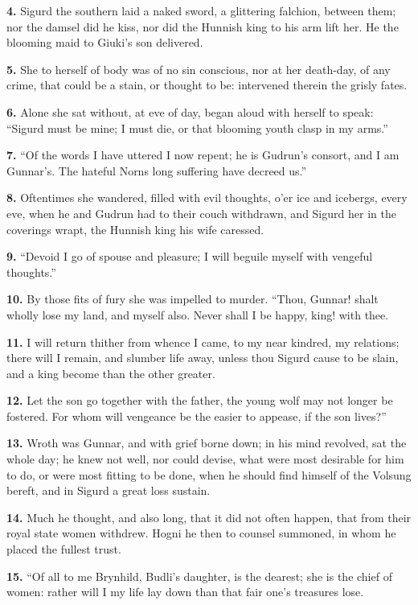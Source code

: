 \textbf{4.} Sigurd the southern laid a naked sword, a glittering falchion,
between them; nor the damsel did he kiss, nor did the Hunnish king to
his arm lift her. He the blooming maid to Giuki's son delivered.

\textbf{5.} She to herself of body was of no sin conscious, nor at her
death-day, of any crime, that could be a stain, or thought to be:
intervened therein the grisly fates.

\textbf{6.} Alone she sat without, at eve of day, began aloud with herself to
speak: ``Sigurd must be mine; I must die, or that blooming youth clasp
in my arms.''

\textbf{7.} ``Of the words I have uttered I now repent; he is Gudrun's
consort, and I am Gunnar's. The hateful Norns long suffering have
decreed us.''

\textbf{8.} Oftentimes she wandered, filled with evil thoughts, o'er ice and
icebergs, every eve, when he and Gudrun had to their couch withdrawn,
and Sigurd her in the coverings wrapt, the Hunnish king his wife
caressed.

\textbf{9.} ``Devoid I go of spouse and pleasure; I will beguile myself with
vengeful thoughts.''

\textbf{10.} By those fits of fury she was impelled to murder. ``Thou, Gunnar!
shalt wholly lose my land, and myself also. Never shall I be happy,
king! with thee.

\textbf{11.} I will return thither from whence I came, to my near kindred, my
relations; there will I remain, and slumber life away, unless thou
Sigurd cause to be slain, and a king become than the other greater.

\textbf{12.} Let the son go together with the father, the young wolf may not
longer be fostered. For whom will vengeance be the easier to appease,
if the son lives?''

\textbf{13.} Wroth was Gunnar, and with grief borne down; in his mind
revolved, sat the whole day; he knew not well, nor could devise, what
were most desirable for him to do, or were most fitting to be done,
when he should find himself of the Volsung bereft, and in Sigurd a
great loss sustain.

\textbf{14.} Much he thought, and also long, that it did not often happen,
that from their royal state women withdrew. Hogni he then to counsel
summoned, in whom he placed the fullest trust.

\textbf{15.} ``Of all to me Brynhild, Budli's daughter, is the dearest; she is
the chief of women: rather will I my life lay down than that fair
one's treasures lose.

